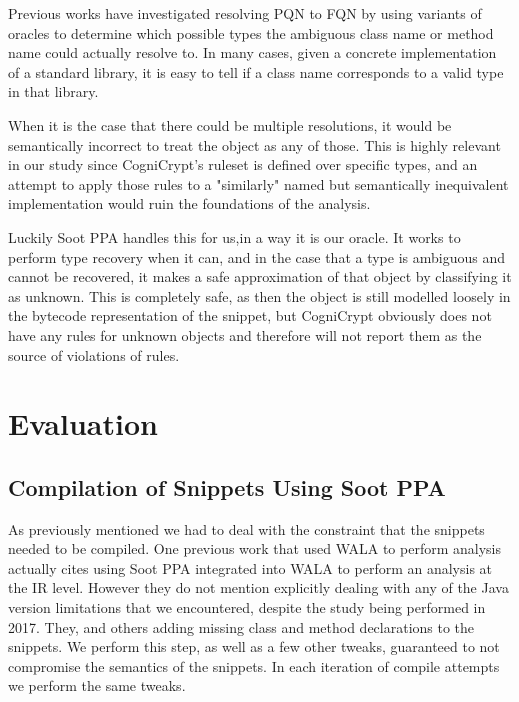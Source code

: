 \documentclass[10pt, conference]{IEEEtran}
\begin{document}
Previous works \cite{Subramanian:2014:LAD:2568225.2568313} have investigated resolving PQN to FQN by using variants of oracles to determine which possible types the ambiguous class name or method name could actually resolve to. In many cases, given a concrete implementation of a standard library, it is easy to tell if a class name corresponds to a valid type in that library. 

When it is the case that there could be multiple resolutions, it would be semantically incorrect to treat the object as any of those. This is highly relevant in our study since CogniCrypt's ruleset is defined over specific types, and an attempt to apply those rules to a "similarly" named but semantically inequivalent implementation would ruin the foundations of the analysis.

Luckily Soot PPA handles this for us,in a way it is our oracle. It works to perform type recovery when it can, and in the case that a type is ambiguous and cannot be recovered, it makes a safe approximation of that object by classifying it as unknown. This is completely safe, as then the object is still modelled loosely in the bytecode representation of the snippet, but CogniCrypt obviously does not have any rules for unknown objects and therefore will not report them as the source of violations of rules.

\section{Evaluation}

\subsection{Compilation of Snippets Using Soot PPA}

As previously mentioned we had to deal with the constraint that the snippets needed to be compiled. One previous work that used WALA to perform analysis \cite{7958574} actually cites using Soot PPA integrated into WALA to perform an analysis at the IR level. However they do not mention explicitly dealing with any of the Java version limitations that we encountered, despite the study being performed in 2017. They, and others \cite{Subramanian:2013:MSO:2487085.2487106} adding missing class and method declarations to the snippets. We perform this step, as well as a few other tweaks, guaranteed to not compromise the semantics of the snippets. In each iteration of compile attempts we perform the same tweaks. 
\end{document}
